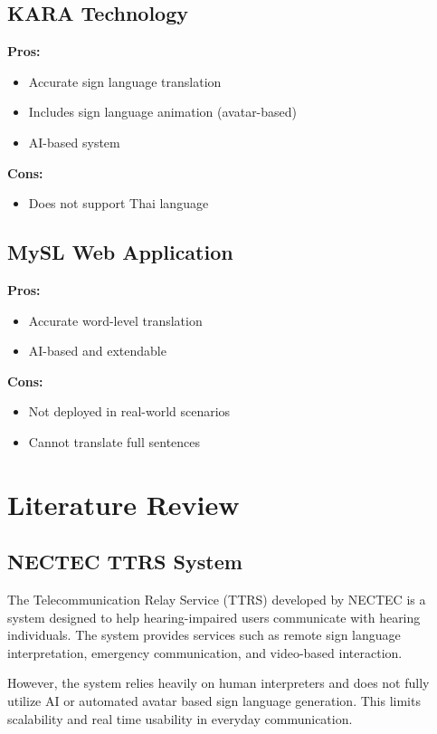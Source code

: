 \subsection{KARA Technology}
\textbf{Pros:}
\begin{itemize}[leftmargin=3cm]
    \item Accurate sign language translation
    \item Includes sign language animation (avatar-based)
    \item AI-based system
\end{itemize}

\textbf{Cons:}
\begin{itemize}[leftmargin=3cm]
    \item Does not support Thai language
\end{itemize}

\subsection{MySL Web Application}
\textbf{Pros:}
\begin{itemize}[leftmargin=3cm]
    \item Accurate word-level translation
    \item AI-based and extendable
\end{itemize}

\textbf{Cons:}
\begin{itemize}[leftmargin=3cm]
    \item Not deployed in real-world scenarios
    \item Cannot translate full sentences
\end{itemize}

\section{Literature Review}
\label{section:literature-review}

\subsection{NECTEC TTRS System}

The Telecommunication Relay Service (TTRS) developed by NECTEC is a system designed to help hearing-impaired users communicate with hearing individuals. The system provides services such as remote sign language interpretation, emergency communication, and video-based interaction.

However, the system relies heavily on human interpreters and does not fully utilize AI or automated avatar based sign language generation. This limits scalability and real time usability in everyday communication.

